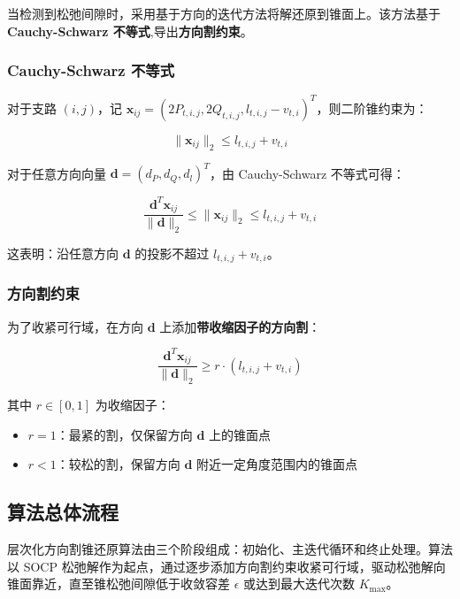 \documentclass[12pt,a4paper]{article}
\begin{document}
当检测到松弛间隙时，采用基于方向的迭代方法将解还原到锥面上。该方法基于 \textbf{Cauchy-Schwarz 不等式},导出\textbf{方向割约束}。

\subsubsection{Cauchy-Schwarz 不等式}

对于支路 $(i,j)$，记 $\mathbf{x}_{ij} = (2P_{t,i,j}, 2Q_{t,i,j}, l_{t,i,j} - v_{t,i})^T$，则二阶锥约束为：

\begin{equation}
\|\mathbf{x}_{ij}\|_2 \leq l_{t,i,j} + v_{t,i}
\end{equation}

对于任意方向向量 $\mathbf{d} = (d_P, d_Q, d_l)^T$，由 Cauchy-Schwarz 不等式可得：

\begin{equation}
\frac{\mathbf{d}^T \mathbf{x}_{ij}}{\|\mathbf{d}\|_2} \leq \|\mathbf{x}_{ij}\|_2 \leq {l_{t,i,j} + v_{t,i}}
\end{equation}

这表明：沿任意方向 $\mathbf{d}$ 的投影不超过 $l_{t,i,j} + v_{t,i}$。

\subsubsection{方向割约束}

为了收紧可行域，在方向 $\mathbf{d}$ 上添加\textbf{带收缩因子的方向割}：

\begin{equation}
\frac{\mathbf{d}^T \mathbf{x}_{ij}}{\|\mathbf{d}\|_2} \geq r \cdot (l_{t,i,j} + v_{t,i})
\end{equation}

其中 $r \in [0, 1]$ 为收缩因子：
\begin{itemize}
\item $r = 1$：最紧的割，仅保留方向 $\mathbf{d}$ 上的锥面点
\item $r < 1$：较松的割，保留方向 $\mathbf{d}$ 附近一定角度范围内的锥面点
\end{itemize}

\newpage
\subsection{算法总体流程}

层次化方向割锥还原算法由三个阶段组成：初始化、主迭代循环和终止处理。算法以 SOCP 松弛解作为起点，通过逐步添加方向割约束收紧可行域，驱动松弛解向锥面靠近，直至锥松弛间隙低于收敛容差 $\epsilon$ 或达到最大迭代次数 $K_{\max}$。
\end{document}
